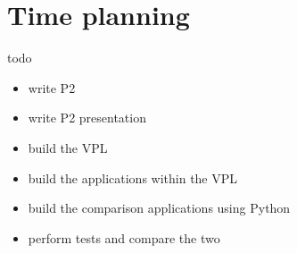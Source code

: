 \newpage
\section{Time planning}

todo
\begin{itemize}
    \item write P2
    \item write P2 presentation
    \item build the VPL
    \item build the applications within the VPL
    \item build the comparison applications using Python
    \item perform tests and compare the two
\end{itemize}






